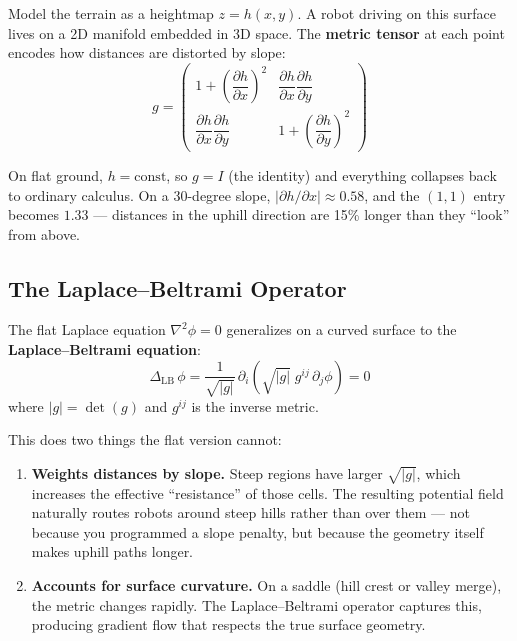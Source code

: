 \documentclass[11pt]{article}
\begin{document}
Model the terrain as a heightmap $z = h(x,y)$.  A robot driving on
this surface lives on a 2D manifold embedded in 3D space.  The
\textbf{metric tensor} at each point encodes how distances are
distorted by slope:
\begin{equation}
    g = \begin{pmatrix}
    1 + \left(\dfrac{\partial h}{\partial x}\right)^{\!2} &
    \dfrac{\partial h}{\partial x}\dfrac{\partial h}{\partial y}
    \\[10pt]
    \dfrac{\partial h}{\partial x}\dfrac{\partial h}{\partial y} &
    1 + \left(\dfrac{\partial h}{\partial y}\right)^{\!2}
    \end{pmatrix}
    \label{eq:metric}
\end{equation}

On flat ground, $h = \text{const}$, so $g = I$ (the identity) and
everything collapses back to ordinary calculus.  On a 30-degree
slope, $|\partial h / \partial x| \approx 0.58$, and the $(1,1)$
entry becomes $1.33$ --- distances in the uphill direction are 15\%
longer than they ``look'' from above.

\subsection{The Laplace--Beltrami Operator}

The flat Laplace equation $\nabla^2\phi = 0$ generalizes on a
curved surface to the \textbf{Laplace--Beltrami equation}:
\begin{equation}
    \Delta_{\mathrm{LB}}\,\phi =
    \frac{1}{\sqrt{|g|}}\,\partial_i\!\left(
    \sqrt{|g|}\; g^{ij}\,\partial_j\phi
    \right) = 0
    \label{eq:laplace_beltrami}
\end{equation}
where $|g| = \det(g)$ and $g^{ij}$ is the inverse metric.

This does two things the flat version cannot:
\begin{enumerate}
    \item \textbf{Weights distances by slope.}  Steep regions
    have larger $\sqrt{|g|}$, which increases the effective
    ``resistance'' of those cells.  The resulting potential field
    naturally routes robots around steep hills rather than over
    them --- not because you programmed a slope penalty, but
    because the geometry itself makes uphill paths longer.
    \item \textbf{Accounts for surface curvature.}  On a saddle
    (hill crest or valley merge), the metric changes rapidly.
    The Laplace--Beltrami operator captures this, producing
    gradient flow that respects the true surface geometry.
\end{enumerate}
\end{document}
